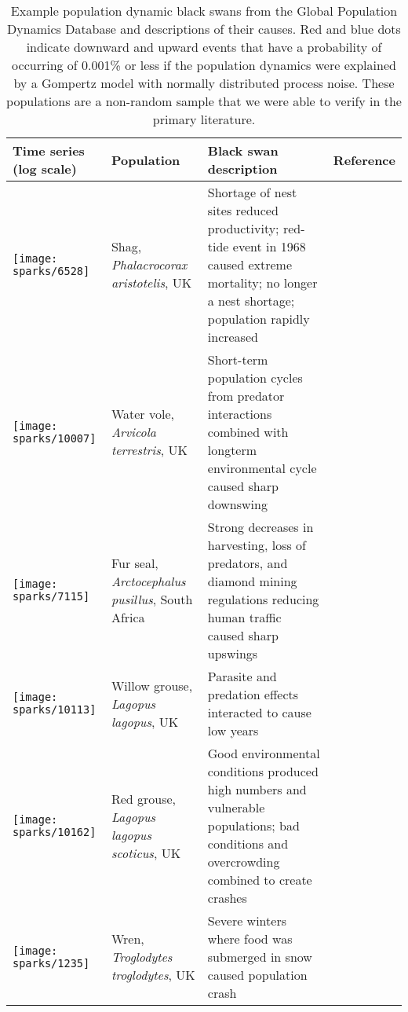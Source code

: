 \documentclass[11pt]{article}
\begin{document}
\begin{small}
\begin{longtable}{>{\RaggedRight}m{2.0cm}>{\RaggedRight}p{3.0cm}>{\RaggedRight}p{7.0cm}>{\RaggedRight}p{2.0cm}}

\caption{Example population dynamic black swans from the Global Population Dynamics Database and descriptions of their causes. Red and blue dots indicate downward and upward events that have a probability of occurring of 0.001\% or less if the population dynamics were explained by a Gompertz model with normally distributed process noise. These populations are a non-random sample that we were able to verify in the primary literature.}\\

\toprule
Time series (log scale) & Population & Black swan description & Reference \\
\midrule

\texttt{[image: sparks/6528]} &
Shag,
\textit{Phalacrocorax aristotelis},
UK &
Shortage of nest sites reduced productivity; red-tide event in 1968 caused extreme mortality; no longer a nest shortage; population rapidly increased &
\citep{potts1980}\\

\texttt{[image: sparks/10007]} &
Water vole,
\textit{Arvicola terrestris},
UK &
Short-term population cycles from predator interactions combined with longterm environmental cycle caused sharp downswing  &
\citep{saucy1994}\\

\texttt{[image: sparks/7115]} &
Fur seal,
\textit{Arctocephalus pusillus},
South Africa &
Strong decreases in harvesting, loss of predators, and diamond mining regulations reducing human traffic caused sharp upswings  &
\citep{shaughnessy1982}\\


\texttt{[image: sparks/10113]} &
Willow grouse,
\textit{Lagopus lagopus},
UK &
Parasite and predation effects interacted to cause low years  &
\citep{dobson1995}\\

\texttt{[image: sparks/10162]} &
Red grouse,
\textit{Lagopus lagopus scoticus},
UK &
Good environmental conditions produced high numbers and vulnerable populations; bad conditions and overcrowding combined to create crashes  &
\citep{mackenzie1952}\\

\texttt{[image: sparks/1235]} &
Wren,
\textit{Troglodytes troglodytes},
UK &
Severe winters where food was submerged in snow caused population crash &
\citep{newton1998} \\


\end{longtable}
\end{small}
\end{document}
